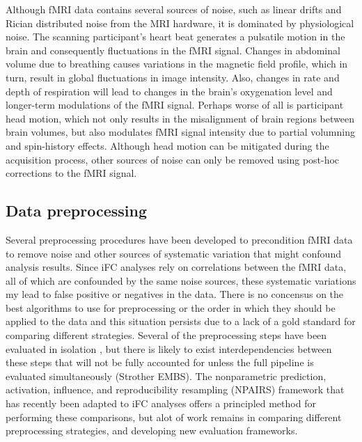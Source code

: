 Although fMRI data contains several sources of noise, such as linear drifts and Rician distributed noise from the MRI hardware\cite{Gudbjartsson1995}, it is dominated by physiological noise. The scanning participant's heart beat generates a pulsatile motion in the brain and consequently fluctuations in the fMRI signal\cite{birn2012}. Changes in abdominal volume due to breathing causes variations in the magnetic field profile, which in turn, result in global fluctuations in image intensity\cite{birn2012}. Also, changes in rate and depth of respiration will lead to changes in the brain's oxygenation level and longer-term modulations of the fMRI signal\cite{birn2012}. Perhaps worse of all is participant head motion, which not only results in the misalignment of brain regions between brain volumes, but also modulates fMRI signal intensity due to partial volumning and spin-history effects. Although head motion can be mitigated during the acquisition process, other sources of noise can only be removed using post-hoc corrections to the fMRI signal.

\subsection{Data preprocessing}

Several preprocessing procedures have been developed to precondition fMRI data to remove noise and other sources of systematic variation that might confound analysis results. Since iFC analyses rely on correlations between the fMRI data, all of which are confounded by the same noise sources, these systematic variations my lead to false positive or negatives in the data. There is no concensus on the best algorithms to use for preprocessing or the order in which they should be applied to the data and this situation persists due to a lack of a gold standard for comparing different strategies. Several of the preprocessing steps have been evaluated in isolation \cite{Powers, VanDijk, Yan, Yan, Satterthwaite, Satterthwaite, Murphy, Birn, Chang, Saad}, but there is likely to exist interdependencies between these steps that will not be fully accounted for unless the full pipeline is evaluated simultaneously (Strother EMBS). The nonparametric prediction, activation, influence, and reproducibility
resampling (NPAIRS) framework \cite{Strother2002, Laconte2003} that has recently been adapted to iFC analyses \cite{Chu2012, Craddock2013} offers a principled method for performing these comparisons, but alot of work remains in comparing different preprocessing strategies, and developing new evaluation frameworks.

